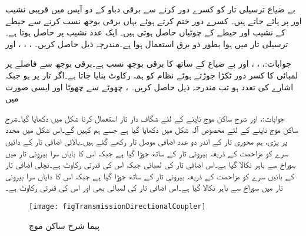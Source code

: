 بے ضیاع  ترسیلی تار کو کسرے دور کرنے سے برقی دباو کے دو آپس میں قریبی نشیب  اور  پر پائے جاتے ہیں۔ کسرے دور ختم کرتے ہوئے یہاں برقی بوجھ نسب کرنے سے  حیطے کے نشیب اور  حیطے کے چوٹیاں حاصل ہوتی ہیں۔ ایک عدد نشیب  پر حاصل ہوتا ہے۔ترسیلی تار میں ہوا بطور ذو برق استعمال ہوا ہے۔مندرجہ ذیل حاصل کریں۔ ، ، ،  اور 

جوابات:، ، ،
  اور 
بے ضیاع  کے ساتھ  کا برقی بوجھ نسب ہے۔برقی بوجھ سے  فاصلے پر  لمبائی کا کسر دور ٹکڑا جوڑتے ہوئے نظام کو ہمہ رکاوٹ بنایا جاتا ہے۔اگر تار پر  ہو جبکہ اشارے کی تعدد  ہو تب مندرجہ ذیل حاصل کریں۔ ، چھوٹے سے چھوٹا  اور ایسی صورت میں 

جوابات:،  اور 
شرح ساکن موج ناپنے کے لئے شگاف دار تار استعمال کرنا شکل  میں دکھایا گیا۔شرح ساکن موج ناپنے کے لئے مخصوص آلہ شکل  میں دکھایا گیا ہے جسے ہم  کہیں گے۔اس شکل میں  محدد پر پڑی، ہم محوری تار کے اندر دو عدد اضافی موصل تار رکھے گئے ہیں۔بالائی اضافی تار کے دائیں سرے کو مزاحمت  کے ذریعہ بیرونی تار کے ساتھ جوڑا گیا ہے جبکہ اس کا بایاں سرا بیرونی تار میں سوراخ سے باہر نکالا گیا ہے۔اس اضافی تار کی لمبائی  جبکہ اس کی قدرتی رکاوٹ  ہے۔نچلی اضافی تار کے بائیں سرے کو مزاحمت  کے ذریعہ بیرونی تار کے ساتھ جوڑا گیا ہے جبکہ اس کا دایاں سرا بیرونی تار میں سوراخ سے باہر نکالا گیا ہے۔اس اضافی تار کی لمبائی بھی  اور اس کی قدرتی رکاوٹ  ہے۔

\begin{figure}
\centering
\texttt{[image: figTransmissionDirectionalCoupler]}
\caption{پیما شرح ساکن موج}
\label{شکل_ترسیلی_آلہ_پیما_شرح_ساکن_موج}
\end{figure}

